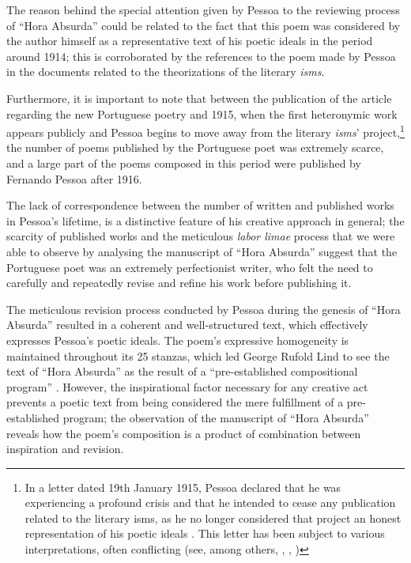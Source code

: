 \documentclass{article}
\begin{document}
The reason behind the special attention given by Pessoa to the reviewing
process of ``Hora Absurda'' could be related to the fact that this poem
was considered by the author himself as a representative text of his
poetic ideals in the period around 1914; this is corroborated by the
references to the poem made by Pessoa in the documents related to the
theorizations of the literary \emph{isms}.

Furthermore, it is important to note that between the publication of the
article regarding the new Portuguese poetry \citep{pessoa_nova_1912} and 1915, when the
first heteronymic work appears publicly and Pessoa begins to move away
from the literary \emph{isms}' project,\footnote{In a letter dated 19th
  January 1915, Pessoa declared that he was experiencing a profound
  crisis and that he intended to cease any publication related to the
  literary isms, as he no longer considered that project an honest
  representation of his poetic ideals \citep[356]{pessoa_sensacionismo_2009}. This letter
  has been subject to various interpretations, often conflicting (see,
  among others, \cite{gagliardi_uma_2004}, \cite{amado_orpheu_2015}, \cite{miraglia_dia_2020})} the number
of poems published by the Portuguese poet was extremely scarce, and a
large part of the poems composed in this period were published by
Fernando Pessoa after 1916.

The lack of correspondence between the number of written and published
works in Pessoa's lifetime, is a distinctive feature of his creative
approach in general; the scarcity of published works and the meticulous
\emph{labor limae} process that we were able to observe by analysing the
manuscript of ``Hora Absurda'' suggest that the Portuguese poet was an
extremely perfectionist writer, who felt the need to carefully and
repeatedly revise and refine his work before publishing it.

The meticulous revision process conducted by Pessoa during the genesis
of ``Hora Absurda'' resulted in a coherent and well-structured text,
which effectively expresses Pessoa's poetic ideals. The poem's
expressive homogeneity is maintained throughout its 25 stanzas, which
led George Rufold Lind to see the text of ``Hora Absurda'' as the result
of a ``pre-established compositional program'' \citep[23]{lind_teoria_1970}. However, the
inspirational factor necessary for any creative act prevents a poetic
text from being considered the mere fulfillment of a pre-established
program; the observation of the manuscript of ``Hora Absurda'' reveals
how the poem's composition is a product of combination between
inspiration and revision.
\end{document}
